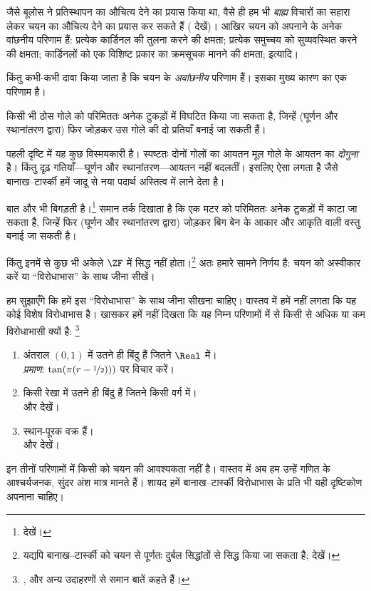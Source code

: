 \documentclass[../../../include/open-logic-section]{subfiles}
\begin{document}

जैसे बूलोस ने प्रतिस्थापन का औचित्य देने का प्रयास किया था, वैसे ही हम भी
\emph{बाह्य} विचारों का सहारा लेकर चयन का औचित्य देने का प्रयास कर सकते हैं
( देखें)। आखिर चयन को अपनाने के अनेक
वांछनीय परिणाम हैं: प्रत्येक कार्डिनल की तुलना करने की क्षमता; प्रत्येक
समुच्चय को सुव्यवस्थित करने की क्षमता; कार्डिनलों को एक विशिष्ट प्रकार का
क्रमसूचक मानने की क्षमता; इत्यादि।

किंतु कभी-कभी दावा किया जाता है कि चयन के \emph{अवांछनीय} परिणाम हैं। इसका
मुख्य कारण \cite{BanachTarski1924} का एक परिणाम है।

\begin{thm}[बानाख--टार्स्की विरोधाभास ($\ZFC$ में)]
किसी भी ठोस गोले को परिमिततः अनेक टुकड़ों में विघटित किया जा सकता है, जिन्हें
(घूर्णन और स्थानांतरण द्वारा) फिर जोड़कर उस गोले की दो प्रतियाँ बनाई जा सकती
हैं।
\end{thm}
\noindent 
पहली दृष्टि में यह कुछ विस्मयकारी है। स्पष्टतः दोनों गोलों का आयतन मूल गोले
के आयतन का \emph{दोगुना} है। किंतु दृढ़ गतियाँ---घूर्णन और स्थानांतरण---आयतन
नहीं बदलतीं। इसलिए ऐसा लगता है जैसे बानाख--टार्स्की हमें जादू से नया पदार्थ
अस्तित्व में लाने देता है।

बात और भी बिगड़ती है।\footnote{\citet[Theorem 3.12]{Wagon2016} देखें।}
समान तर्क दिखाता है कि एक मटर को परिमिततः अनेक टुकड़ों में काटा जा सकता है,
जिन्हें फिर (घूर्णन और स्थानांतरण द्वारा) जोड़कर बिग बेन के आकार और आकृति
वाली वस्तु बनाई जा सकती है।

किंतु इनमें से कुछ भी अकेले $\ZF$ में सिद्ध नहीं होता।\footnote{यद्यपि
बानाख--टार्स्की को चयन से पूर्णतः दुर्बल सिद्धांतों से सिद्ध किया जा सकता
है; \citet[303]{Wagon2016} देखें।} अतः हमारे सामने निर्णय है: चयन को
अस्वीकार करें या ``विरोधाभास'' के साथ जीना सीखें।

हम सुझाएँगे कि हमें इस ``विरोधाभास'' के साथ जीना सीखना चाहिए। वास्तव में
हमें नहीं लगता कि यह कोई विशेष विरोधाभास है। खासकर हमें नहीं दिखता कि यह
निम्न परिणामों में से किसी से अधिक या कम विरोधाभासी क्यों है:
\footnote{\citet[276--7]{Potter2004}, \citet[16]{Weston2003} और
\citet[31, 308--9]{Wagon2016} अन्य उदाहरणों से समान बातें कहते हैं।}
\begin{enumerate}
	\item अंतराल $(0,1)$ में उतने ही बिंदु हैं जितने $\Real$ में।
	\\\emph{प्रमाण}: $\tan(\pi(r-\nicefrac{1}{2})))$ पर विचार करें।
	\item किसी रेखा में उतने ही बिंदु हैं जितने किसी वर्ग में।
	\\ और  देखें।
	\item स्थान-पूरक वक्र हैं।
	\\ और  देखें।
\end{enumerate}
इन तीनों परिणामों में किसी को चयन की आवश्यकता नहीं है। वास्तव में अब हम
उन्हें गणित के आश्चर्यजनक, सुंदर अंश मात्र मानते हैं। शायद हमें
बानाख--टार्स्की विरोधाभास के प्रति भी यही दृष्टिकोण अपनाना चाहिए।
\end{document}
